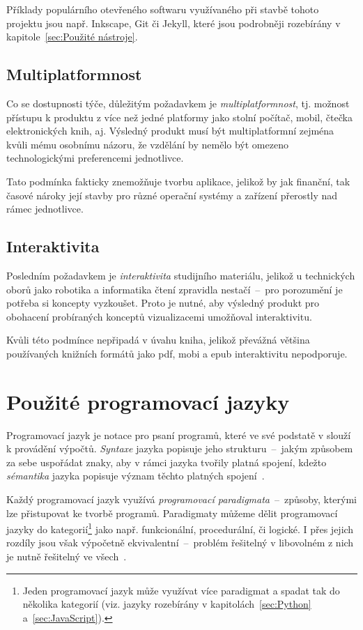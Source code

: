 \documentclass[a4paper, 12pt, twoside]{article}
\begin{document}
  Příklady populárního otevřeného softwaru využívaného při stavbě tohoto projektu jsou např. Inkscape, Git či Jekyll, které jsou podrobněji rozebírány v kapitole~\ref{sec:Použité nástroje}.


  \subsection{Multiplatformnost}
  Co se dostupnosti týče, důležitým požadavkem je \emph{multiplatformnost}, tj. možnost přístupu k produktu z více než jedné platformy jako stolní počítač, mobil, čtečka elektronických knih, aj. Výsledný produkt musí být multiplatformní zejména kvůli mému osobnímu názoru, že vzdělání by nemělo být omezeno technologickými preferencemi jednotlivce.

  Tato podmínka fakticky znemožňuje tvorbu aplikace, jelikož by jak finanční, tak časové nároky její stavby pro různé operační systémy a zařízení přerostly nad rámec jednotlivce.


  \subsection{Interaktivita}
  Posledním požadavkem je \emph{interaktivita} studijního materiálu, jelikož u technických oborů jako robotika a informatika čtení zpravidla nestačí~--~pro porozumění je potřeba si koncepty vyzkoušet. Proto je nutné, aby výsledný  produkt pro obohacení probíraných konceptů vizualizacemi umožňoval interaktivitu.

  Kvůli této podmínce nepřipadá v úvahu kniha, jelikož převážná většina používaných knižních formátů jako \gls{pdf}, \gls{mobi} a \gls{epub} interaktivitu nepodporuje.


  \section{Použité programovací jazyky} \label{sec:Použité programovací jazyky}
  Programovací jazyk je notace pro psaní programů, které ve své podstatě v slouží k provádění výpočtů. \emph{Syntaxe} jazyka popisuje jeho strukturu~--~jakým způsobem za sebe uspořádat znaky, aby v rámci jazyka tvořily platná spojení, kdežto \emph{sémantika} jazyka popisuje význam těchto platných spojení~\cite{intro-to-programming-languages}.

  Každý programovací jazyk využívá \emph{programovací paradigmata}~--~způsoby, kterými lze přistupovat ke tvorbě programů. Paradigmaty můžeme dělit programovací jazyky do kategorií\footnote{Jeden programovací jazyk může využívat více paradigmat a spadat tak do několika kategorií (viz. jazyky rozebírány v kapitolách~\ref{sec:Python} a~\ref{sec:JavaScript}).} jako např. funkcionální, procedurální, či logické. I přes jejich rozdíly jsou však výpočetně ekvivalentní~--~problém řešitelný v libovolném z nich je nutně řešitelný ve všech~\cite{intro-to-programming-languages}.
\end{document}

